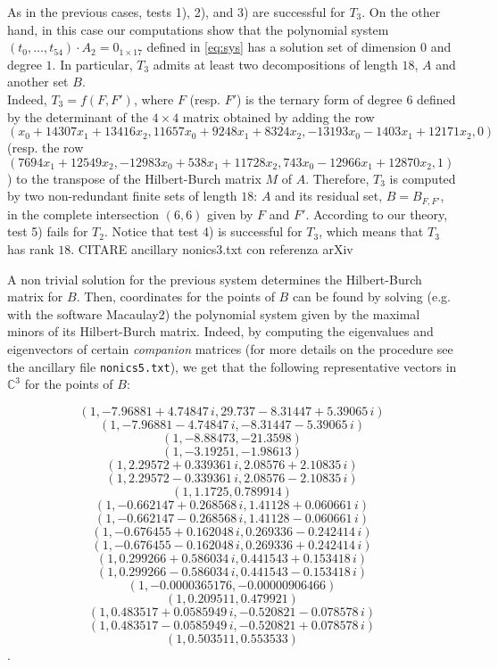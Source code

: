 \documentclass{amsart}
\newcommand{\C}{\mathbb{C}}
\theoremstyle{definition}
\begin{document}
\noindent As in the previous cases, tests 1), 2), and 3) are successful for $ T_{3} $. On the other hand, in this case our computations show that the polynomial system $(t_{0}, \ldots, t_{54})\cdot A_{2} = 0_{1 \times 17}$ defined in \eqref{eq:sys} has a solution set of dimension $0$ and degree $1$. %
In particular, $ T_{3} $ admits at least two decompositions of length $18$, $ A $ and another set $B$.\\
\noindent Indeed, $ T_{3} = f(F,F') $, where $ F $ (resp. $ F' $) is the ternary form of degree $ 6 $ defined by the determinant of the $ 4\times 4 $ matrix obtained by adding the row $ (x_{0}+14307x_{1}+13416x_{2}, 11657x_{0}+ 9248x_{1}+ 8324x_{2}, -13193x_{0}-1403x_{1}+12171x_{2}, 0) $ (resp. the row $(7694x_{1}+12549x_{2}, -12983x_{0}+538x_{1}+11728x_{2}, 743x_{0}-12966x_{1}+12870x_{2},1)$) to the transpose of the Hilbert-Burch matrix $ M $ of $ A $. Therefore, $ T_{3} $ is computed by two non-redundant finite sets of length $ 18 $: $ A $ and its residual set, $B= B_{F,F'} $, in the complete intersection $ (6,6) $ given by $ F $ and $ F' $. According to our theory, test 5) fails for $ T_{2} $. Notice that test 4) is successful for $ T_{3} $, which means that $ T_{3} $ has rank $ 18 $.  CITARE ancillary nonics3.txt con referenza arXiv

\noindent A non trivial solution for the previous system determines the Hilbert-Burch matrix for $B$. Then, coordinates for the points of $B$ can be found by solving (e.g. with the software Macaulay2) the polynomial system given by the maximal minors of its Hilbert-Burch matrix. Indeed, by computing the eigenvalues and eigenvectors of certain \emph{companion} matrices (for more details on the procedure see the ancillary file {\tt{nonics5.txt}}), we get that the following representative vectors in $ \C^{3} $ for the points of $ B $:
 
{\small{$$ (1,-7.96881+4.74847 \,i ,29.737-8.31447+5.39065 \,i) $$
$$ (1,-7.96881-4.74847\, i,-8.31447-5.39065\, i) $$
$$ (1,-8.88473,-21.3598) $$
$$ (1,-3.19251,-1.98613) $$
$$ (1,2.29572+0.339361 \, i,2.08576+2.10835\, i) $$
$$ (1,2.29572-0.339361 \, i,2.08576-2.10835 \, i) $$
$$ (1,1.1725,0.789914) $$
$$ (1,-0.662147+0.268568 \, i,1.41128+0.060661 \, i) $$
$$ (1,-0.662147-0.268568 \, i,1.41128-0.060661 \, i) $$
$$ (1,-0.676455+0.162048 \,i,0.269336-0.242414 \, i) $$
$$ (1,-0.676455-0.162048 \, i, 0.269336+0.242414 \, i) $$
$$ (1,0.299266+0.586034 \, i,0.441543+0.153418 \, i) $$
$$ (1,0.299266-0.586034 \, i, 0.441543-0.153418 \, i) $$
$$ (1,-0.0000365176,-0.00000906466) $$
$$ (1,0.209511,0.479921) $$
$$ (1,0.483517+0.0585949 \, i,-0.520821-0.078578\, i) $$
$$ (1,0.483517-0.0585949 \, i,-0.520821+0.078578 \, i) $$
$$ (1,0.503511, 0.553533) $$}}.





\end{document}
